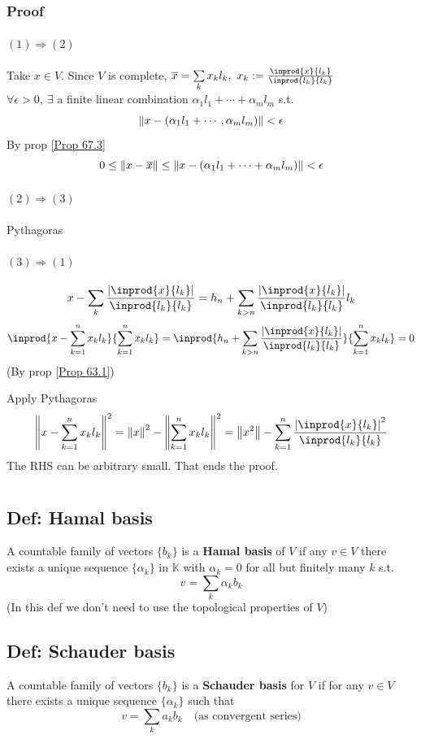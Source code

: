 \documentclass{book}
\newcommand{\abs}[1]{\left\lvert #1 \right\rvert}
\begin{document}
\subsection*{Proof}
\subsubsection{$(1)\Rightarrow(2)$}Take $x\in V$. Since $V$ is complete, $\overline{x}=\sum\limits_kx_kl_k,\ x_k:=\frac{\inprod{x}{l_k}}{\inprod{l_k}{l_k}}$\\
$\forall\epsilon>0,\ \exists$ a finite linear combination $\alpha_1l_1+\cdots+\alpha_ml_m$ s.t.$$\left\lVert x-(\alpha_1l_1+\cdots,\alpha_ml_m) \right\rVert<\epsilon$$
By prop \ref{Prop 67.3}$$0\leq\left\lVert x-\overline{x} \right\rVert\leq\left\lVert x-(\alpha_1l_1+\cdots+\alpha_ml_m) \right\rVert<\epsilon$$
\subsubsection{$(2)\Rightarrow(3)$}Pythagoras
\subsubsection{$(3)\Rightarrow(1)$}
$$x-\sum\limits_k\frac{\abs{\inprod{x}{l_k}}}{\inprod{l_k}{l_k}}=h_n+\sum\limits_{k>n}\frac{\abs{\inprod{x}{l_k}}}{\inprod{l_k}{l_k}}l_k$$
$$\inprod{x-\sum\limits_{k=1}^nx_kl_k}{\sum\limits_{k=1}^nx_kl_k}=\inprod{h_n+\sum\limits_{k>n}\frac{\abs{\inprod{x}{l_k}}}{\inprod{l_k}{l_k}}}{\sum\limits_{k=1}^nx_kl_k}=0$$
(By prop \ref{Prop 63.1})

Apply Pythagoras
$$\norm{x-\sum\limits_{k=1}^nx_kl_k}^2=\norm{x}^2-\norm{\sum\limits_{k=1}^nx_kl_k}^2=\norm{x^2}-\sum\limits_{k=1}^n\frac{\abs{\inprod{x}{l_k}}^2}{\inprod{l_k}{l_k}}$$
The RHS can be arbitrary small. That ends the proof.

\chapter{}
\section{Def: Hamal basis}A countable family of vectors $\{b_k\}$ is a \textbf{Hamal basis} of $V$ if any $v\in V$ there exists a unique sequence $\{\alpha_k\}$ in $\mathbb{K}$ with $\alpha_k=0$ for all but finitely many $k$ s.t. $$v=\sum\limits_k\alpha_kb_k$$
(In this def we don't need to use the topological properties of $V$)
\section{Def: Schauder basis}A countable family of vectors $\{b_k\}$ is a \textbf{Schauder basis} for $V$ if for any $v\in V$ there exists a unique sequence $\{\alpha_k\}$ such that$$v=\sum\limits_k a_kb_k\quad \text{(as convergent series)}$$
\end{document}
